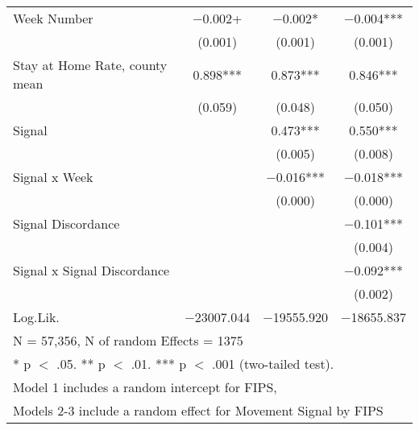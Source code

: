 \begin{table}[!h]
\begin{tabular}[t]{lccc}
Week Number & \num{-0.002}+ & \num{-0.002}* & \num{-0.004}***\\
 & (\num{0.001}) & (\num{0.001}) & (\num{0.001})\\
Stay at Home Rate, county mean & \num{0.898}*** & \num{0.873}*** & \num{0.846}***\\
 & (\num{0.059}) & (\num{0.048}) & (\num{0.050})\\
Signal &  & \num{0.473}*** & \num{0.550}***\\
 &  & (\num{0.005}) & (\num{0.008})\\
Signal x Week &  & \num{-0.016}*** & \num{-0.018}***\\
 &  & (\num{0.000}) & (\num{0.000})\\
Signal Discordance &  &  & \num{-0.101}***\\
 &  &  & (\num{0.004})\\
Signal x Signal Discordance &  &  & \num{-0.092}***\\
 &  &  & (\num{0.002})\\
\midrule
Log.Lik. & \num{-23007.044} & \num{-19555.920} & \num{-18655.837}\\
\bottomrule
\multicolumn{4}{l}{\rule{0pt}{1em}N = 57,356, N of random Effects = 1375}\\
\multicolumn{4}{l}{\rule{0pt}{1em}* p $<$ .05. ** p $<$ .01. *** p $<$ .001 (two-tailed test).}\\
\multicolumn{4}{l}{\rule{0pt}{1em}Model 1 includes a random intercept for FIPS,}\\
\multicolumn{4}{l}{\rule{0pt}{1em}Models 2-3 include a random effect for Movement Signal by FIPS}\\
\end{tabular}
\end{table}